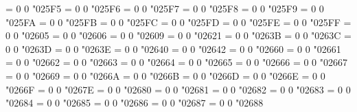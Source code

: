 \Umathchardef\circlellquad = 0 0 "025F5 %
\Umathchardef\circlelrquad = 0 0 "025F6 %
\Umathchardef\circleurquad = 0 0 "025F7 %
\Umathchardef\ultriangle = 0 0 "025F8 %
\Umathchardef\urtriangle = 0 0 "025F9 %
\Umathchardef\lltriangle = 0 0 "025FA %
\Umathchardef\mdwhtsquare = 0 0 "025FB %
\Umathchardef\mdblksquare = 0 0 "025FC %
\Umathchardef\mdsmwhtsquare = 0 0 "025FD %
\Umathchardef\mdsmblksquare = 0 0 "025FE %
\Umathchardef\lrtriangle = 0 0 "025FF %
\Umathchardef\bigstar = 0 0 "02605 %
\Umathchardef\bigwhitestar = 0 0 "02606 %
\Umathchardef\astrosun = 0 0 "02609 %
\Umathchardef\danger = 0 0 "02621 %
\Umathchardef\blacksmiley = 0 0 "0263B %
\Umathchardef\sun = 0 0 "0263C %
\Umathchardef\rightmoon = 0 0 "0263D %
\Umathchardef\leftmoon = 0 0 "0263E %
\Umathchardef\female = 0 0 "02640 %
\Umathchardef\male = 0 0 "02642 %
\Umathchardef\spadesuit = 0 0 "02660 %
\Umathchardef\heartsuit = 0 0 "02661 %
\Umathchardef\diamondsuit = 0 0 "02662 %
\Umathchardef\clubsuit = 0 0 "02663 %
\Umathchardef\varspadesuit = 0 0 "02664 %
\Umathchardef\varheartsuit = 0 0 "02665 %
\Umathchardef\vardiamondsuit = 0 0 "02666 %
\Umathchardef\varclubsuit = 0 0 "02667 %
\Umathchardef\quarternote = 0 0 "02669 %
\Umathchardef\eighthnote = 0 0 "0266A %
\Umathchardef\twonotes = 0 0 "0266B %
\Umathchardef\flat = 0 0 "0266D %
\Umathchardef\natural = 0 0 "0266E %
\Umathchardef\sharp = 0 0 "0266F %
\Umathchardef\acidfree = 0 0 "0267E %
\Umathchardef\dicei = 0 0 "02680 %
\Umathchardef\diceii = 0 0 "02681 %
\Umathchardef\diceiii = 0 0 "02682 %
\Umathchardef\diceiv = 0 0 "02683 %
\Umathchardef\dicev = 0 0 "02684 %
\Umathchardef\dicevi = 0 0 "02685 %
\Umathchardef\circledrightdot = 0 0 "02686 %
\Umathchardef\circledtwodots = 0 0 "02687 %
\Umathchardef\blackcircledrightdot = 0 0 "02688 %
